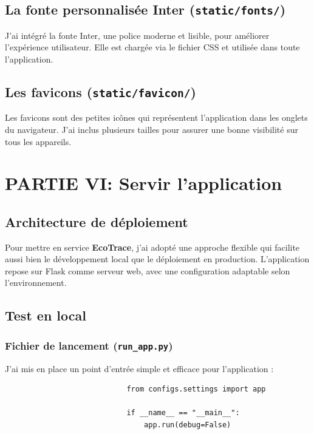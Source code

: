 \documentclass[a4paper,11pt]{article}
\begin{document}
            \subsection{La fonte personnalisée Inter (\texttt{static/fonts/})}
                \noindent J'ai intégré la fonte Inter, une police moderne et lisible, pour améliorer l'expérience utilisateur. Elle est chargée via le fichier CSS et utilisée dans toute l'application.

            \subsection{Les favicons (\texttt{static/favicon/})}
                \noindent Les favicons sont des petites icônes qui représentent l'application dans les onglets du navigateur. J'ai inclus plusieurs tailles pour assurer une bonne visibilité sur tous les appareils.

        \newpage

        \section{PARTIE VI: Servir l'application}
            \subsection{Architecture de déploiement}
                \noindent Pour mettre en service \textbf{EcoTrace}, j'ai adopté une approche flexible qui facilite aussi bien le développement local que le déploiement en production. L'application repose sur Flask comme serveur web, avec une configuration adaptable selon l'environnement.

            \subsection{Test en local}
                \subsubsection{Fichier de lancement (\texttt{run\_app.py})}
                    \noindent J'ai mis en place un point d'entrée simple et efficace pour l'application :
                    \begin{tcolorbox}[colback=lightgray!6, colframe=black, left=-45mm, right=5mm, top=2mm, bottom=0mm, boxrule=0.1mm]
                        \begin{verbatim}
                            from configs.settings import app

                            if __name__ == "__main__":
                                app.run(debug=False)
                        \end{verbatim}
                    \end{tcolorbox}
\end{document}

